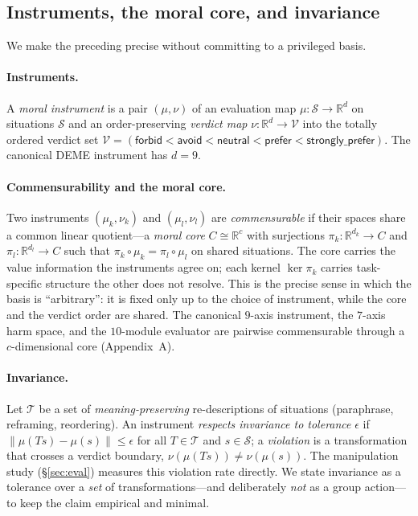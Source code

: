 \subsection{Instruments, the moral core, and invariance}
\label{sec:formal}
We make the preceding precise without committing to a privileged basis.

\paragraph{Instruments.} A \emph{moral instrument} is a pair $(\mu,\nu)$ of an evaluation map
$\mu:\mathcal{S}\to\mathbb{R}^{d}$ on situations $\mathcal{S}$ and an order-preserving
\emph{verdict map} $\nu:\mathbb{R}^{d}\to\mathcal{V}$ into the totally ordered verdict set
$\mathcal{V}=(\textsf{forbid}<\textsf{avoid}<\textsf{neutral}<\textsf{prefer}<\textsf{strongly\_prefer})$.
The canonical DEME instrument has $d=9$.

\paragraph{Commensurability and the moral core.} Two instruments $(\mu_k,\nu_k)$ and
$(\mu_l,\nu_l)$ are \emph{commensurable} if their spaces share a common linear quotient---a
\emph{moral core} $C\cong\mathbb{R}^{c}$ with surjections $\pi_k:\mathbb{R}^{d_k}\!\to\!C$ and
$\pi_l:\mathbb{R}^{d_l}\!\to\!C$ such that $\pi_k\!\circ\!\mu_k=\pi_l\!\circ\!\mu_l$ on shared
situations. The core carries the value information the instruments agree on; each kernel
$\ker\pi_k$ carries task-specific structure the other does not resolve. This is the precise
sense in which the basis is ``arbitrary'': it is fixed only up to the choice of instrument,
while the core and the verdict order are shared. The canonical $9$-axis instrument, the
$7$-axis harm space, and the $10$-module evaluator are pairwise commensurable through a
$c$-dimensional core (Appendix~A).

\paragraph{Invariance.} Let $\mathcal{T}$ be a set of \emph{meaning-preserving} re-descriptions
of situations (paraphrase, reframing, reordering). An instrument \emph{respects invariance to
tolerance} $\epsilon$ if $\lVert\mu(Ts)-\mu(s)\rVert\le\epsilon$ for all $T\in\mathcal{T}$ and
$s\in\mathcal{S}$; a \emph{violation} is a transformation that crosses a verdict boundary,
$\nu(\mu(Ts))\neq\nu(\mu(s))$. The manipulation study (\S\ref{sec:eval}) measures this violation
rate directly. We state invariance as a tolerance over a \emph{set} of transformations---and
deliberately \emph{not} as a group action---to keep the claim empirical and minimal.

